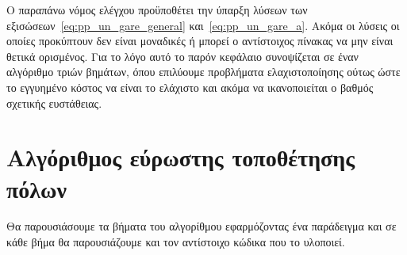 Ο παραπάνω νόμος ελέγχου προϋποθέτει την ύπαρξη λύσεων των εξισώσεων~\eqref{eq:pp_un_gare_general}
και~\eqref{eq:pp_un_gare_a}. Ακόμα οι λύσεις οι οποίες προκύπτουν δεν είναι
μοναδικές ή μπορεί ο αντίστοιχος πίνακας  να μην είναι θετικά
ορισμένος. Για το λόγο αυτό το παρόν κεφάλαιο συνοψίζεται σε έναν αλγόριθμο
τριών βημάτων, όπου επιλύουμε προβλήματα ελαχιστοποίησης  ούτως ώστε το
εγγυημένο κόστος να είναι το ελάχιστο και ακόμα να ικανοποιείται ο βαθμός
σχετικής ευστάθειας.

\section{Αλγόριθμος εύρωστης τοποθέτησης πόλων}
Θα παρουσιάσουμε τα βήματα του αλγορίθμου εφαρμόζοντας ένα παράδειγμα και σε
κάθε βήμα θα παρουσιάζουμε και τον αντίστοιχο κώδικα  που το
υλοποιεί.

